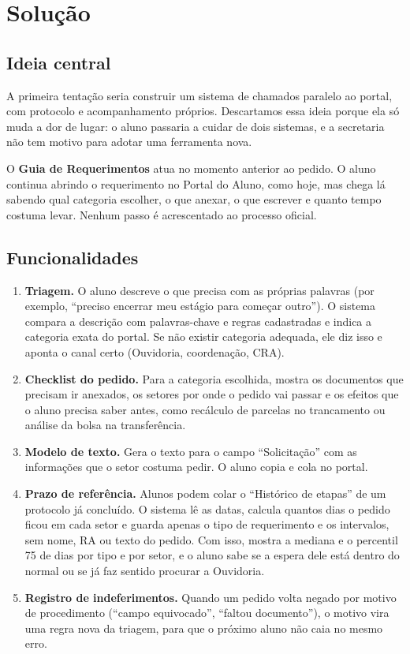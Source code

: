 \documentclass[12pt,a4paper]{article}
\begin{document}
\section{Solução}

\subsection{Ideia central}

A primeira tentação seria construir um sistema de chamados paralelo ao portal, com protocolo e
acompanhamento próprios. Descartamos essa ideia porque ela só muda a dor de lugar: o aluno passaria a
cuidar de dois sistemas, e a secretaria não tem motivo para adotar uma ferramenta nova.

O \textbf{Guia de Requerimentos} atua no momento anterior ao pedido. O aluno continua abrindo o
requerimento no Portal do Aluno, como hoje, mas chega lá sabendo qual categoria escolher, o que anexar,
o que escrever e quanto tempo costuma levar. Nenhum passo é acrescentado ao processo oficial.

\subsection{Funcionalidades}

\begin{enumerate}
  \item \textbf{Triagem.} O aluno descreve o que precisa com as próprias palavras (por exemplo,
        ``preciso encerrar meu estágio para começar outro''). O sistema compara a descrição com
        palavras-chave e regras cadastradas e indica a categoria exata do portal. Se não existir
        categoria adequada, ele diz isso e aponta o canal certo (Ouvidoria, coordenação, CRA).
  \item \textbf{Checklist do pedido.} Para a categoria escolhida, mostra os documentos que precisam ir
        anexados, os setores por onde o pedido vai passar e os efeitos que o aluno precisa saber antes,
        como recálculo de parcelas no trancamento ou análise da bolsa na transferência.
  \item \textbf{Modelo de texto.} Gera o texto para o campo ``Solicitação'' com as informações que o
        setor costuma pedir. O aluno copia e cola no portal.
  \item \textbf{Prazo de referência.} Alunos podem colar o ``Histórico de etapas'' de um protocolo já
        concluído. O sistema lê as datas, calcula quantos dias o pedido ficou em cada setor e guarda
        apenas o tipo de requerimento e os intervalos, sem nome, RA ou texto do pedido. Com isso,
        mostra a mediana e o percentil 75 de dias por tipo e por setor, e o aluno sabe se a espera dele
        está dentro do normal ou se já faz sentido procurar a Ouvidoria.
  \item \textbf{Registro de indeferimentos.} Quando um pedido volta negado por motivo de procedimento
        (``campo equivocado'', ``faltou documento''), o motivo vira uma regra nova da triagem, para que
        o próximo aluno não caia no mesmo erro.
\end{enumerate}
\end{document}
